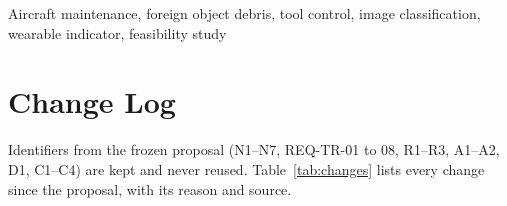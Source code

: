 \begin{abstract}
This report records what changed since the frozen proposal, compares the
candidate concepts, and sets out the evidence behind each claim. A
before/after (checkout versus sign-off) comparison detects removed tools
quickly but cannot name the tool in a slot and gives false alarms on a
complete kit. The chosen concept is a hybrid: the comparison finds which
slots changed, and a learned slot classifier names what is in each slot.
In the full proof-of-concept run on Nov 20, with every setting frozen and
on photos the model never saw, the hybrid flagged 90/90 removals, caught
29 of 30 look-alike swaps, and answered every one of 420 checks within
1.27\,s. It gave 5 false alarms in 300 complete-kit checks, against a pass
mark of 0 (the comparison alone gave 112). The watch showed every result,
and showed NOT CONFIRMED in 60/60 checks with the link cut. A computer
stood in for the custom processor throughout; the low-cost processor test
is left open for Gate~2. The recommendation is to proceed with conditions.
\end{abstract}

\begin{IEEEkeywords}
Aircraft maintenance, foreign object debris, tool control, image
classification, wearable indicator, feasibility study
\end{IEEEkeywords}

\section{Change Log}
Identifiers from the frozen proposal (N1--N7, REQ-TR-01 to 08, R1--R3,
A1--A2, D1, C1--C4) are kept and never reused. Table~\ref{tab:changes} lists
every change since the proposal, with its reason and source.

